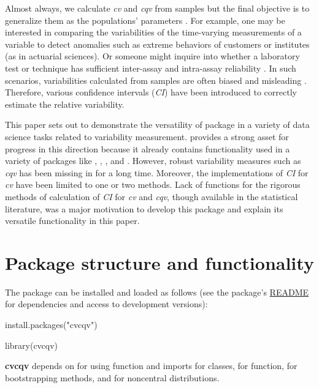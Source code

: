 Almost always, we calculate \emph{cv} and \emph{cqv} from samples but the final objective is to generalize them as the populations' parameters \citep{Albatineh:2014}. For example, one may be interested in comparing the variabilities of the time-varying measurements of a variable to detect anomalies such as extreme behaviors of customers or institutes (as in actuarial sciences). Or someone might inquire into whether a laboratory test or technique has sufficient inter-assay and intra-assay reliability \citep{Panichkitkosolkul_2013, Payton_1996}. In such scenarios, variabilities calculated from samples are often biased and misleading \citep{sorensen_2002, Payton_1996}. Therefore, various confidence intervals (\emph{CI}) have been introduced to correctly estimate the relative variability. 

This paper sets out to demonstrate the versatility of  package \citep{Beigy_a_2019} in a variety of data science tasks related to variability measurement.  \citep{R} provides a strong asset for progress in this direction because it already contains functionality used in a variety of packages like , , , and . However, robust variability measures such as \emph{cqv} has been missing in  for a long time. Moreover, the implementations of \emph{CI} for \emph{cv} have been limited to one or two methods. Lack of functions for the rigorous methods of calculation of \emph{CI} for \emph{cv} and \emph{cqv}, though available in the statistical literature, was a major motivation to develop this package and explain its versatile functionality in this paper.  

\section{Package structure and functionality}

The package can be installed and loaded as follows (see the package’s \href{https://github.com/MaaniBeigy/cvcqv/blob/master/README.md}{README} for dependencies and access to development versions):

\begin{example}
install.packages("cvcqv")
\end{example}

\begin{example}
library(cvcqv)
\end{example}

\textbf{cvcqv} depends on  \citep{wickham_2019} for using  function and imports  \citep{chang_2019} for  classes,  \citep{grosjean_2018} for  function,  \citep{canty_2019} for bootstrapping methods, and  \citep{kelley_2018} for noncentral distributions.

